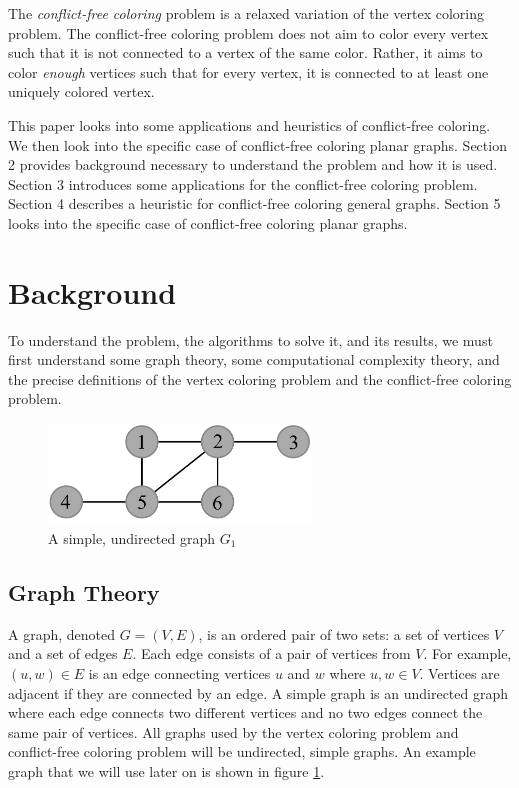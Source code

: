 \documentclass{sig-alternate}
\begin{document}
The \emph{conflict-free coloring} problem is a relaxed variation of the vertex coloring problem. The conflict-free coloring problem does not aim to color every vertex such that it is not connected to a vertex of the same color. Rather, it aims to color \emph{enough} vertices such that for every vertex, it is connected to at least one uniquely colored vertex.

This paper looks into some applications and heuristics of conflict-free coloring. We then look into the specific case of conflict-free coloring planar graphs. Section 2 provides background necessary to understand the problem and how it is used. Section 3 introduces some applications for the conflict-free coloring problem. Section 4 describes a heuristic for conflict-free coloring general graphs. Section 5 looks into the specific case of conflict-free coloring planar graphs.


\section{Background}
\label{sec:background}
To understand the problem, the algorithms to solve it, and its results, we must first understand some graph theory, some computational complexity theory, and the precise definitions of the vertex coloring problem and the conflict-free coloring problem.

\begin{figure}[h]
	\centering
	\includegraphics[width=7cm]{../figures/example.pdf}
	\caption{A simple, undirected graph $G_1$}\label{fig:graph}
\end{figure}

\subsection{Graph Theory}
\label{sec:graphtheory}

A graph, denoted $G=(V,E)$, is an ordered pair of two sets: a set of vertices $V$ and a set of edges $E$. Each edge consists of a pair of vertices from $V$. For example, $(u,w) \in E$ is an edge connecting vertices $u$ and $w$ where $u,w \in V$. Vertices are adjacent if they are connected by an edge. A simple graph is an undirected graph where each edge connects two different vertices and no two edges connect the same pair of vertices. All graphs used by the vertex coloring problem and conflict-free coloring problem will be undirected, simple graphs. An example graph that we will use later on is shown in figure \ref{fig:graph}.
\end{document}
